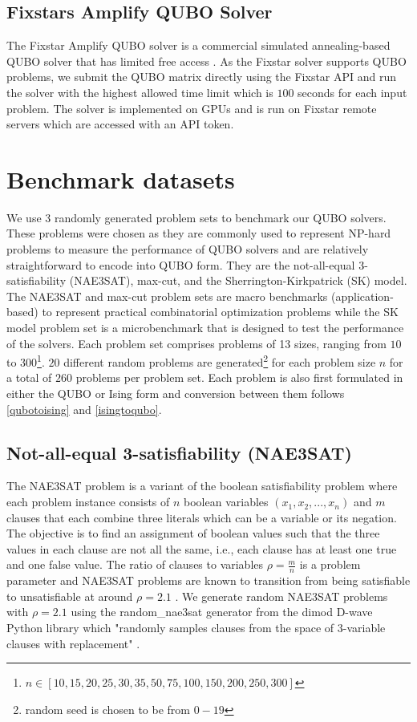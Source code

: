 
\subsection{Fixstars Amplify QUBO Solver}
The Fixstar Amplify QUBO solver is a commercial simulated annealing-based QUBO solver that has limited free access \cite{b12}. As the Fixstar solver supports QUBO problems, we submit the QUBO matrix directly using the Fixstar API and run the solver with the highest allowed time limit which is $100$ seconds for each input problem. The solver is implemented on GPUs and is run on Fixstar remote servers which are accessed with an API token.

\section{Benchmark datasets}
We use 3 randomly generated problem sets to benchmark our QUBO solvers. These problems were chosen as they are commonly used to represent NP-hard problems to measure the performance of QUBO solvers and are relatively straightforward to encode into QUBO form. They are the not-all-equal 3-satisfiability (NAE3SAT), max-cut, and the Sherrington-Kirkpatrick (SK) model. The NAE3SAT and max-cut problem sets are macro benchmarks (application-based) to represent practical combinatorial optimization problems while the SK model problem set is a microbenchmark that is designed to test the performance of the solvers. Each problem set comprises problems of 13 sizes, ranging from $10$ to $300$\footnote{$n \in [10,15,20,25,30,35,50,75,100,150,200,250,300]$}. $20$ different random problems are generated\footnote{random seed is chosen to be from $0-19$} for each problem size $n$ for a total of $260$ problems per problem set. Each problem is also first formulated in either the QUBO or Ising form and conversion between them follows \autoref{qubotoising} and \autoref{isingtoqubo}.

\subsection*{Not-all-equal 3-satisfiability (NAE3SAT)}
The NAE3SAT problem is a variant of the boolean satisfiability problem where each problem instance consists of $n$ boolean variables $(x_1, x_2, ..., x_n)$ and $m$ clauses that each combine three literals which can be a variable or its negation. The objective is to find an assignment of boolean values such that the three values in each clause are not all the same, i.e., each clause has at least one true and one false value. The ratio of clauses to variables $\rho = \frac{m}{n}$ is a problem parameter and NAE3SAT problems are known to transition from being satisfiable to unsatisfiable at around $\rho = 2.1$ \cite{nae3sattransition}. We generate random NAE3SAT problems with $\rho = 2.1$ using the random\_nae3sat generator from the dimod D-wave Python library which "randomly samples clauses from the space of 3-variable clauses with replacement" \cite{dimodrandomnae3sat}. 


